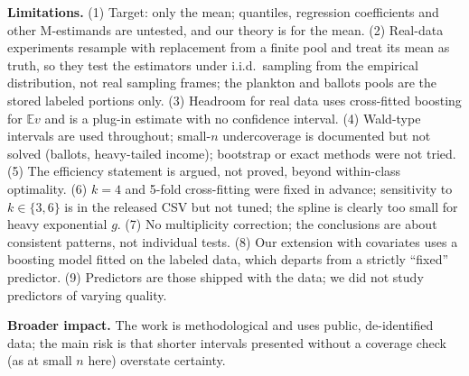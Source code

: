 \documentclass{article}
\newcommand{\E}{\mathbb{E}}
\begin{document}
\textbf{Limitations.} (1) Target: only the mean; quantiles, regression coefficients and other M-estimands are untested, and our theory is for the mean. (2) Real-data experiments resample with replacement from a finite pool and treat its mean as truth, so they test the estimators under i.i.d.\ sampling from the empirical distribution, not real sampling frames; the plankton and ballots pools are the stored labeled portions only. (3) Headroom for real data uses cross-fitted boosting for $\E v$ and is a plug-in estimate with no confidence interval. (4) Wald-type intervals are used throughout; small-$n$ undercoverage is documented but not solved (ballots, heavy-tailed income); bootstrap or exact methods were not tried. (5) The efficiency statement is argued, not proved, beyond within-class optimality. (6) $k=4$ and 5-fold cross-fitting were fixed in advance; sensitivity to $k\in\{3,6\}$ is in the released CSV but not tuned; the spline is clearly too small for heavy exponential $g$. (7) No multiplicity correction; the conclusions are about consistent patterns, not individual tests. (8) Our extension with covariates uses a boosting model fitted on the labeled data, which departs from a strictly ``fixed'' predictor. (9) Predictors are those shipped with the data; we did not study predictors of varying quality.

\textbf{Broader impact.} The work is methodological and uses public, de-identified data; the main risk is that shorter intervals presented without a coverage check (as at small $n$ here) overstate certainty.

\label{endmain}



\appendix

\end{document}
